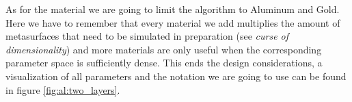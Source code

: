 As for the material we are going to limit the algorithm to Aluminum and Gold. Here we have to remember that every material we add multiplies the amount of metasurfaces that need to be simulated in preparation (see \textit{curse of dimensionality}) and more materials are only useful when the corresponding parameter space is sufficiently dense. This ends the design considerations, a visualization of all parameters and the notation we are going to use can be found in figure \ref{fig:al:two_layers}.
